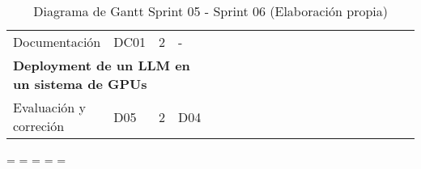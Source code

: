 \begin{table}[H]
\begin{tabular}{|llcllllllllllllllll|l}
        \multicolumn{1}{|l|}{Documentación}                                                                    & \multicolumn{1}{l|}{DC01}                              & \multicolumn{1}{c|}{2}                                   & \multicolumn{1}{l|}{-}                                                  &                                 &                                 &                                 &                                 &                                 & \cellcolor[HTML]{C9C9C9}        & \cellcolor[HTML]{C9C9C9}        & \cellcolor[HTML]{C9C9C9}        & \cellcolor[HTML]{C9C9C9}        & \cellcolor[HTML]{C9C9C9}        & \cellcolor[HTML]{C9C9C9}        & \cellcolor[HTML]{C9C9C9}        & \cellcolor[HTML]{C9C9C9}        & \cellcolor[HTML]{C9C9C9}        & \cellcolor[HTML]{C9C9C9} &  \\ \cline{1-19}
        \multicolumn{4}{|l|}{\textbf{Deployment de un LLM en un sistema de GPUs}}                                                                                                                                                                                                                            & \multicolumn{15}{l|}{}                                                                                                                                                                                                                                                                                                                                                                                                                                                                                               &  \\ \cline{1-19}
        \multicolumn{1}{|l|}{Evaluación y correción}                                                           & \multicolumn{1}{l|}{D05}                               & \multicolumn{1}{c|}{2}                                   & \multicolumn{1}{l|}{D04}                                                & \cellcolor[HTML]{3166FF}        & \cellcolor[HTML]{3166FF}        & \cellcolor[HTML]{3166FF}        & \cellcolor[HTML]{3166FF}        & \cellcolor[HTML]{3166FF}        & \cellcolor[HTML]{3166FF}        & \cellcolor[HTML]{3166FF}        & \cellcolor[HTML]{3166FF}        & \cellcolor[HTML]{3166FF}        & \cellcolor[HTML]{3166FF}        &                                 &                                 &                                 &                                 &                          &  \\ \cline{1-19}
        \end{tabular}
        \caption[Diagrama de Gantt Sprint 05 - Sprint 06]{Diagrama de Gantt Sprint 05 - Sprint 06 (Elaboración propia)}
        \label{tab:Diagrama_gantt_05-06}
    \end{table}
\endgroup
\newpage
\paperwidth=\pdfpageheight
\paperheight=\pdfpagewidth
\pdfpageheight=\paperheight
\pdfpagewidth=\paperwidth
\headwidth=\textwidth

